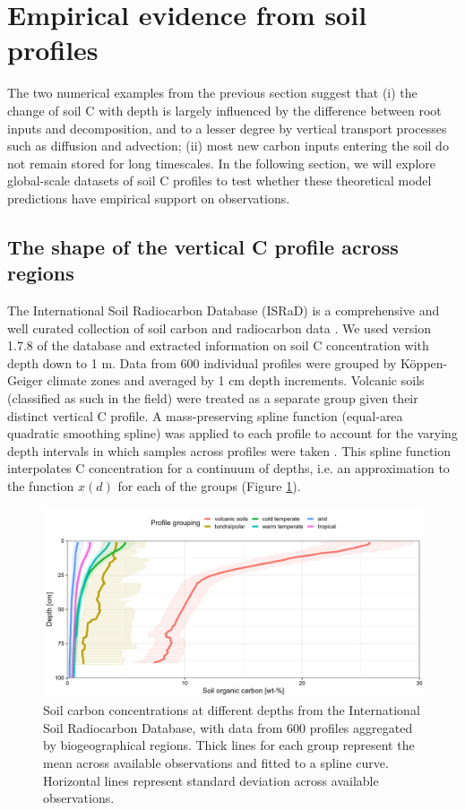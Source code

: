 \documentclass[11pt, oneside, a4paper]{article}   	%
\begin{document}
\section{Empirical evidence from soil profiles}
The two numerical examples from the previous section suggest that (i) the change of soil C with depth is largely influenced by the difference between root inputs and decomposition, and to a lesser degree by vertical transport processes such as diffusion and advection; (ii) most new carbon inputs entering the soil do not remain stored for long timescales. In the following section, we will explore global-scale datasets of soil C profiles to test whether these theoretical model predictions have empirical support on observations.

\subsection{The shape of the vertical C profile across regions}
The International Soil Radiocarbon Database (ISRaD) is a comprehensive and well curated collection of soil carbon and radiocarbon data  \citep{Lawrence2020}. We used version 1.7.8 of the database and extracted information on soil C concentration with depth down to 1 m. Data from 600 individual profiles were grouped by K\"oppen-Geiger climate zones \citep{Beck2018} and averaged by 1 cm depth increments. Volcanic soils (classified as such in the field) were treated as a separate group given their distinct vertical C profile. A mass-preserving spline function (equal-area quadratic smoothing spline) was applied to each profile to account for the varying depth intervals in which samples across profiles were taken \citep{Ponce1986,Bishop1999}. This spline function interpolates C concentration for a continuum of depths, i.e. an approximation to the function $x(d)$ for each of the groups (Figure \ref{fig:Cprofiles}). 


\begin{figure}[htbp]
   \centering
   \includegraphics[width=\textwidth]{Figures/ISRaD_msp_SOC_climate_depth_profile_deriv_2023-04-11.jpeg} %
   \caption{Soil carbon concentrations at different depths from the International Soil Radiocarbon Database, with data from 600 profiles aggregated by biogeographical regions. Thick lines for each group represent the mean across available observations and fitted to a spline curve. Horizontal lines represent standard deviation across available observations. }
   \label{fig:Cprofiles}
\end{figure}
\end{document}
